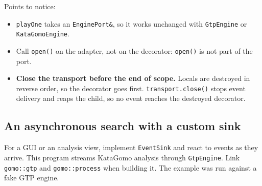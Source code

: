 \documentclass[11pt,a4paper]{article}
\newcommand{\code}[1]{\texttt{#1}}
\begin{document}
\noindent Points to notice:
\begin{itemize}
  \item \code{playOne} takes an \code{EnginePort\&}, so it works unchanged with \code{GtpEngine}
        or \code{KataGomoEngine}.
  \item Call \code{open()} on the adapter, not on the decorator: \code{open()} is not part of the
        port.
  \item \textbf{Close the transport before the end of scope.} Locals are destroyed in reverse
        order, so the decorator goes first. \code{transport.close()} stops event delivery and
        reaps the child, so no event reaches the destroyed decorator.
\end{itemize}

\subsection{An asynchronous search with a custom sink}

For a GUI or an analysis view, implement \code{EventSink} and react to events as they arrive.
This program streams KataGomo analysis through \code{GtpEngine}. Link \code{gomo::gtp} and
\code{gomo::process} when building it. The example was run against a fake GTP engine.
\end{document}
